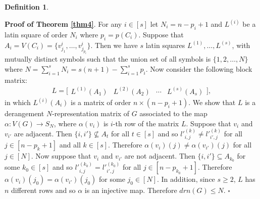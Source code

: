\documentclass[11pt,letterpaper]{article}
\newtheorem{definition}[theorem]{Definition}
\begin{document}
{\begin{definition}
\end{definition}
\textbf{Proof of Theorem \ref{thm4}}. For any $i \in[s]$ let $N_i=n-p_i+1$ and $L^{(i)}$ be a latin square of order $N_i$ where $p_i=p(C_i)$. Suppose that $A_i=V(C_i)=\{v^{i}_{j_1},\ldots,v^{i}_{j_{p_i}}\}$. Then we have $s$ latin squares $L^{(1)},\ldots,L^{(s)}$, with mutually distinct symbols such that the union set of all symbols is $\{1,2,\ldots,N\}$ where $N=\sum_{i=1}^{s}N_i=s(n+1)-\sum_{i=1}^{s}p_i$. Now consider the following block matrix:
\[L=\bigg[\begin{array}{c|c|c|c}
   L^{(1)}(A_1) & L^{(2)}(A_2)&\cdots & L^{(s)}(A_s)
   \end{array}\bigg],\]
in which $L^{(i)}(A_i)$ is a matrix of order $n\times(n-p_i+1)$. We show that $L$ is a derangement $N$-representation matrix of $G$ associated to the map $\alpha:V(G)\rightarrow S_N$, where $\alpha(v_i)$ is $i$-th row of the matrix $L$. Suppose that $v_i$ and $v_{i'}$ are adjacent. Then $\{i,i'\}\nsubseteq A_t$ for all $t\in[s]$ and so $l'^{(k)}_{i,j}\neq l'^{(k)}_{i',j}$ for all $j\in[n-p_k+1]$ and all $k\in [s]$. Therefore $\alpha(v_i)(j)\neq \alpha(v_{i'})(j)$ for all $j\in [N]$. Now suppose that $v_i$ and $v_{i'}$ are not adjacent. Then $\{i,i'\}\subseteq A_{k_0}$ for some $k_0\in [s]$ and so $l'^{(k_0)}_{i,j}= l'^{(k_0)}_{i',j}$ for all $j\in[n-p_{k_0}+1]$. Therefore $\alpha(v_i)(j_0)=\alpha(v_{i'})(j_0)$ for some $j_0\in [N]$. In addition, since $s\geq2$, $L$ has $n$ different rows and so $\alpha$ is an injective map. Therefore $drn(G)\leq N$.
\hfill $\square$
}
\end{document}

